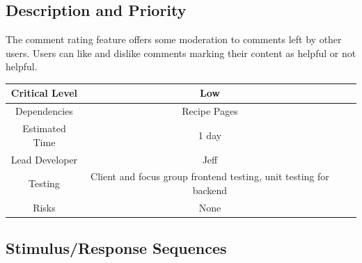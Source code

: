 \documentclass{scrreprt}
\begin{document}
\subsection{Description and Priority}

The comment rating feature offers some moderation to comments left by other users. Users can like and dislike comments marking their content as helpful or not helpful.

\begin{center}
    \begin{tabular}{| c | c | c | c |}
        \hline
        Critical Level & Low                                                               \\
        \hline
        Dependencies   & Recipe Pages                                                      \\
        \hline
        Estimated Time & 1 day                                                             \\
        \hline
        Lead Developer & Jeff                                                 \\
        \hline
        Testing         & Client and focus group \gls{frontend} testing,
                          \gls{unit testing} for \gls{backend}                             \\
        \hline
        Risks          & None                                                              \\
        \hline
    \end{tabular}
\end{center}

\subsection{Stimulus/Response Sequences}
\end{document}
